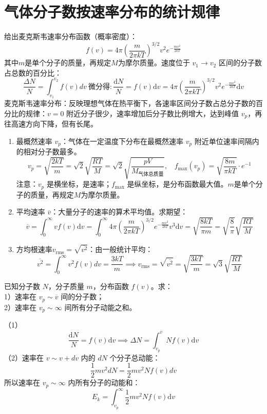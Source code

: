 
\section{气体分子数按速率分布的统计规律}

\begin{definition}[三种统计速率]
给出麦克斯韦速率分布函数（概率密度）：
\[
f(v)=4\pi\left(\frac{m}{2\pi kT}\right)^{3/2}v^2e^{-\frac{mv^2}{2kT}}
\]其中$m$是单个分子的质量，再规定$M$为摩尔质量。速度位于 \(v_1\to v_2\) 区间的分子数占总数的百分比：
\[\frac{\Delta N}{N}=\int_{v_1}^{v_2}f(v)dv~\text{微分得}:\frac{\mathrm dN}{N}=f(v)\mathrm dv=4\pi\left(\frac{m}{2\pi kT}\right)^{3/2}v^2e^{-\frac{mv^2}{2kT}}\mathrm dv\]麦克斯韦速率分布：反映理想气体在热平衡下，各速率区间分子数占总分子数的百分比的规律：\(v=0\) 附近分子很少，速率增加后分子数比例增大，达到峰值 \(v_p\)，再往高速方向下降，但有长尾。
\begin{enumerate}
    \item 最概然速率 \(v_p\)：气体在一定温度下分布在最概然速率 \(v_p\) 附近单位速率间隔内的相对分子数最多。
    \[v_p=\sqrt{\frac{2kT}{m}}=\sqrt2\sqrt{\frac{RT}{M}}=\sqrt2\sqrt{\frac{pV}{M_{气体总质量}}},~~~~f_{\max}(v_p)=\sqrt{\frac{8m}{\pi kT}}\cdot e^{-1}\]注意：\(v_p\) 是横坐标，是速率；\(f_{\max}\) 是纵坐标，是分布函数最大值。$m$是单个分子的质量，再规定$M$为摩尔质量。
    \item 平均速率 \(\overline v\)：大量分子的速率的算术平均值。求期望：
\[\overline v=\int_0^\infty vf(v)\mathrm dv=\int_0^\infty 4\pi\left(\frac{m}{2\pi kT}\right)^{3/2}e^{-\frac{mv^2}{2kT}}v^3\mathrm dv=\sqrt{\frac{8kT}{\pi m}}=\sqrt{\frac{8}{\pi }}\sqrt{\dfrac{RT}{M}}\]
\item 方均根速率\(v_{\text{rms}}=\sqrt{\overline{v^2}}\)：由一般统计平均：
\[\overline{v^2}=\int_0^\infty v^2f(v)dv=\frac{3kT}{m}\implies v_{\text{rms}}=\sqrt{\overline{v^2}}=\sqrt{\frac{3kT}{m}}=\sqrt3\sqrt{\frac{RT}{M}}\]
\end{enumerate}
\end{definition}

\begin{exercise}
已知分子数 \(N\)，分子质量 \(m\)，分布函数 \(f(v)\)。求：\\
1）速率在 \(v_p\sim \overline v\) 间的分子数；\\
2）速率在 \(v_p\sim\infty\) 间所有分子动能之和。
\end{exercise}
\begin{solution}
（1）\[\frac{\mathrm dN}{N}=f(v)\mathrm dv\implies \Delta N=\int_{v_p}^{\overline v}Nf(v)\mathrm dv\]
（2）速率在 \(v\sim v+dv\) 内的 \(dN\) 个分子总动能：\[\frac12mv^2dN=\frac12mv^2Nf(v)dv\]所以速率在 \(v_p\sim\infty\) 内所有分子的动能和：\[E_k=\int_{v_p}^{\infty}\frac12mv^2Nf(v)\mathrm dv\]
\end{solution}

